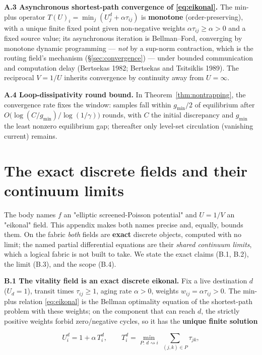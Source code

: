 \documentclass[11pt]{article}
\theoremstyle{plain}
\numberwithin{equation}{section}
\begin{document}
\textbf{A.3 Asynchronous shortest-path convergence of \eqref{eq:eikonal}.} The min-plus operator $T(U)_i=\min_j(U^d_j+ \alpha\tau_{ij})$ is \textbf{monotone} (order-preserving), with a unique finite fixed point given non-negative weights $\alpha\tau_{ij}\ge\alpha>0$ and a fixed source value; its asynchronous iteration is Bellman–Ford, converging by monotone dynamic programming — \emph{not} by a sup-norm contraction, which is the routing field's mechanism (§\ref{sec:convergence}) — under bounded communication and computation delay (Bertsekas 1982; Bertsekas and Tsitsiklis 1989). The reciprocal $V=1/U$ inherits convergence by continuity away from $U=\infty$.

\textbf{A.4 Loop-dissipativity round bound.} In Theorem~\ref{thm:nontrapping}, the convergence rate fixes the window: samples fall within $g_{\min}/2$ of equilibrium after $O\!\big(\log(C/g_{\min})/\log(1/\gamma)\big)$ rounds, with $C$ the initial discrepancy and $g_{\min}$ the least nonzero equilibrium gap; thereafter only level-set circulation (vanishing current) remains.

\section{The exact discrete fields and their continuum limits}\label{app:fields}

The body names $f$ an "elliptic screened-Poisson potential" and $U=1/V$ an "eikonal" field. This appendix makes both names precise and, equally, bounds them. On the fabric \emph{both} fields are \textbf{exact} discrete objects, computed with no limit; the named partial differential equations are their \emph{shared continuum limits}, which a logical fabric is not built to take. We state the exact claims (B.1, B.2), the limit (B.3), and the scope (B.4).

\textbf{B.1 The vitality field is an exact discrete eikonal.} Fix a live destination $d$ ($U_d=1$), transit times $\tau_{ij}\ge 1$, aging rate $\alpha>0$, weights $w_{ij}=\alpha\tau_{ij}>0$. The min-plus relation \eqref{eq:eikonal} is the Bellman optimality equation of the shortest-path problem with these weights; on the component that can reach $d$, the strictly positive weights forbid zero/negative cycles, so it has the \textbf{unique finite solution}

\[
U^d_i = 1 + \alpha\, T^d_i,\qquad T^d_i=\min_{P:\,d\rightsquigarrow i}\ \sum_{(j,k)\in P}\tau_{jk},
\]
\end{document}
